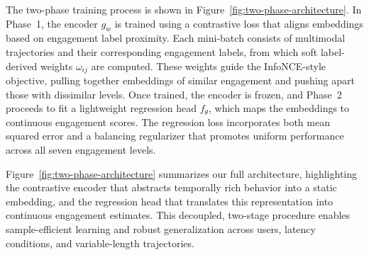 \documentclass[review]{vgtc}                 %
\begin{document}
The two-phase training process is shown in Figure~\ref{fig:two-phase-architecture}. 
In Phase~1, the encoder \( g_w \) is trained using a contrastive loss that aligns embeddings based on engagement label proximity.  Each mini-batch consists of multimodal trajectories and their corresponding engagement labels, from which soft label-derived weights \( \omega_{ij} \) are computed. 
These weights guide the InfoNCE-style objective, pulling together embeddings of similar engagement and pushing apart those with dissimilar levels. 
Once trained, the encoder is frozen, and Phase~2 proceeds to fit a lightweight regression head \( f_\theta \), which maps the embeddings to continuous engagement scores. 
The regression loss incorporates both mean squared error and a balancing regularizer that promotes uniform performance across all seven engagement levels. 

Figure~\ref{fig:two-phase-architecture} summarizes our full architecture, highlighting the contrastive encoder that abstracts temporally rich behavior into a static embedding, and the regression head that translates this representation into continuous engagement estimates.  This decoupled, two-stage procedure enables sample-efficient learning and robust generalization across users, latency conditions, and variable-length trajectories.



\end{document}
